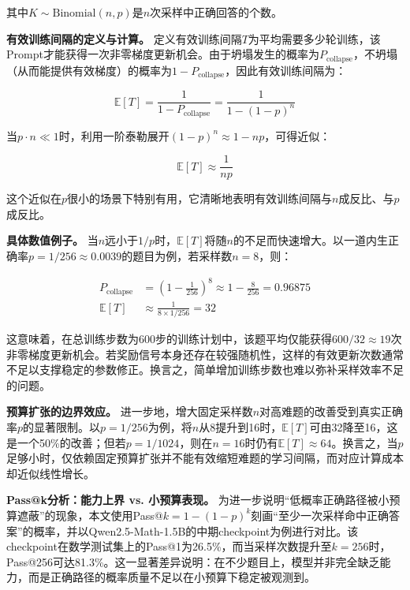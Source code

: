其中$K \sim \text{Binomial}(n, p)$是$n$次采样中正确回答的个数。

\textbf{有效训练间隔的定义与计算。} 定义有效训练间隔$T$为平均需要多少轮训练，该Prompt才能获得一次非零梯度更新机会。由于坍塌发生的概率为$P_\text{collapse}$，不坍塌（从而能提供有效梯度）的概率为$1 - P_\text{collapse}$，因此有效训练间隔为：

\begin{equation}
\mathbb{E}[T] = \frac{1}{1 - P_\text{collapse}} = \frac{1}{1 - (1-p)^n}
\label{eq:effective_interval}
\end{equation}

当$p \cdot n \ll 1$时，利用一阶泰勒展开$(1-p)^n \approx 1 - np$，可得近似：

\begin{equation}
\mathbb{E}[T] \approx \frac{1}{np}
\label{eq:effective_interval_approx}
\end{equation}

这个近似在$p$很小的场景下特别有用，它清晰地表明有效训练间隔与$n$成反比、与$p$成反比。

\textbf{具体数值例子。} 当$n$远小于$1/p$时，$\mathbb{E}[T]$将随$n$的不足而快速增大。以一道内生正确率$p = 1/256 \approx 0.0039$的题目为例，若采样数$n = 8$，则：

\begin{align}
P_\text{collapse} &= \left(1 - \frac{1}{256}\right)^8 \approx 1 - \frac{8}{256} = 0.96875 \\
\mathbb{E}[T] &\approx \frac{1}{8 \times 1/256} = 32
\end{align}

这意味着，在总训练步数为600步的训练计划中，该题平均仅能获得$600 / 32 \approx 19$次非零梯度更新机会。若奖励信号本身还存在较强随机性，这样的有效更新次数通常不足以支撑稳定的参数修正。换言之，简单增加训练步数也难以弥补采样效率不足的问题。

\textbf{预算扩张的边界效应。} 进一步地，增大固定采样数$n$对高难题的改善受到真实正确率$p$的显著限制。以$p=1/256$为例，将$n$从8提升到16时，$\mathbb{E}[T]$可由32降至16，这是一个50\%的改善；但若$p=1/1024$，则在$n=16$时仍有$\mathbb{E}[T] \approx 64$。换言之，当$p$足够小时，仅依赖固定预算扩张并不能有效缩短难题的学习间隔，而对应计算成本却近似线性增长。

\textbf{Pass@k分析：能力上界 vs. 小预算表现。} 为进一步说明“低概率正确路径被小预算遮蔽”的现象，本文使用Pass@$k = 1 - (1-p)^k$刻画“至少一次采样命中正确答案”的概率，并以Qwen2.5-Math-1.5B的中期checkpoint为例进行对比。该checkpoint在数学测试集上的Pass@1为26.5\%，而当采样次数提升至$k=256$时，Pass@256可达81.3\%。这一显著差异说明：在不少题目上，模型并非完全缺乏能力，而是正确路径的概率质量不足以在小预算下稳定被观测到。

